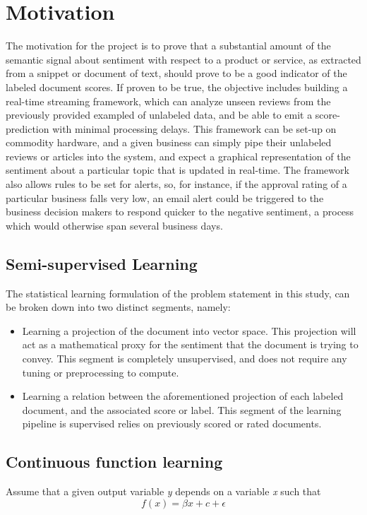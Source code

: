 \documentclass[conference]{IEEEtran}
\begin{document}
\section{Motivation}
    The motivation for the project is to prove that a substantial amount of the semantic signal about sentiment with respect to a product or service, as extracted from a snippet or document of text, should prove to be a good indicator of the labeled document scores. 
    If proven to be true, the objective includes building a real-time streaming framework, which can analyze unseen reviews from the previously provided exampled of unlabeled data, and be able to emit a score-prediction with minimal processing delays.
    This framework can be set-up on commodity hardware, and a given business can simply pipe their unlabeled reviews or articles into the system, and expect a graphical representation of the sentiment about a particular topic that is updated in real-time. 
    The framework also allows rules to be set for alerts, so, for instance, if the approval rating of a particular business falls very low, an email alert could be triggered to the business decision makers to respond quicker to the negative sentiment, a process which would otherwise span several business days.

    \subsection{Semi-supervised Learning}
        The statistical learning formulation of the problem statement in this study, can be broken down into two distinct segments, namely:
        \begin{itemize}
            \item Learning a projection of the document into vector space. This projection will act as a mathematical proxy for the sentiment that the document is trying to convey. This segment is completely unsupervised, and does not require any tuning or preprocessing to compute.
            \item Learning a relation between the aforementioned projection of each labeled document, and the associated score or label. This segment of the learning pipeline is supervised relies on previously scored or rated documents.
        \end{itemize}

    \subsection{Continuous function learning}
        Assume that a given output variable \textit{y} depends on a variable \textit{x} such that
        \begin{equation}
            \displaystyle f(x) = \beta x + c + \epsilon
        \end{equation}
\end{document}
